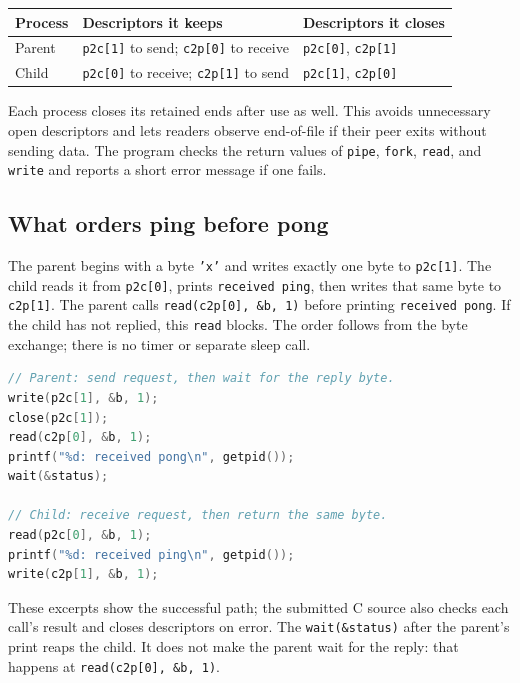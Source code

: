 \documentclass[12pt]{article}
\begin{document}
\begin{center}
\begin{tabular}{>{\raggedright\arraybackslash}p{2.2cm}
                >{\raggedright\arraybackslash}p{4.8cm}
                >{\raggedright\arraybackslash}p{4.8cm}}
\toprule
Process & Descriptors it keeps & Descriptors it closes \\
\midrule
Parent & \texttt{p2c[1]} to send; \texttt{c2p[0]} to receive &
  \texttt{p2c[0]}, \texttt{c2p[1]} \\
Child & \texttt{p2c[0]} to receive; \texttt{c2p[1]} to send &
  \texttt{p2c[1]}, \texttt{c2p[0]} \\
\bottomrule
\end{tabular}
\end{center}

Each process closes its retained ends after use as well. This avoids
unnecessary open descriptors and lets readers observe end-of-file if
their peer exits without sending data. The program checks the return
values of \texttt{pipe}, \texttt{fork}, \texttt{read}, and \texttt{write}
and reports a short error message if one fails.

\clearpage
\subsection{What orders ping before pong}
The parent begins with a byte \texttt{'x'} and writes exactly one byte
to \texttt{p2c[1]}. The child reads it from \texttt{p2c[0]}, prints
\texttt{received ping}, then writes that same byte to
\texttt{c2p[1]}. The parent calls \texttt{read(c2p[0], \&b, 1)} before
printing \texttt{received pong}. If the child has not replied, this
\texttt{read} blocks. The order follows from the byte exchange; there
is no timer or separate sleep call.

\begin{lstlisting}[language=C]
// Parent: send request, then wait for the reply byte.
write(p2c[1], &b, 1);
close(p2c[1]);
read(c2p[0], &b, 1);
printf("%d: received pong\n", getpid());
wait(&status);

// Child: receive request, then return the same byte.
read(p2c[0], &b, 1);
printf("%d: received ping\n", getpid());
write(c2p[1], &b, 1);
\end{lstlisting}

These excerpts show the successful path; the submitted C source also
checks each call's result and closes descriptors on error. The
\texttt{wait(\&status)} after the parent's print reaps the child. It
does not make the parent wait for the reply: that happens at
\texttt{read(c2p[0], \&b, 1)}.
\end{document}
